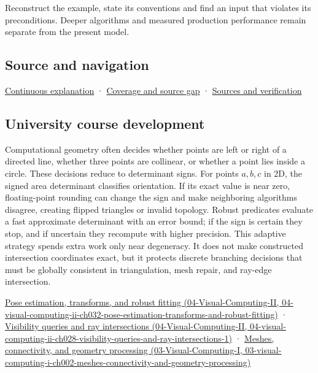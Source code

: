 Reconstruct the example, state its conventions and find an input that violates its preconditions. Deeper algorithms and measured production performance remain separate from the present model.

\subsection{Source and navigation}\label{appendix-da478be01d02-source-and-navigation}

\hyperref[01-foundations-i-ch018-keep-the-promises-visible-while-moving-between-representations]{Continuous explanation} · \hyperref[appendix-fd090d982a15-phase-7---parts-601-700]{Coverage and source gap} · \hyperref[appendix-a103e7846d21-phase-7---source-analysis-and-verification]{Sources and verification}

\subsection{University course development}\label{appendix-da478be01d02-university-course-development}

Computational geometry often decides whether points are left or right of a directed line, whether three points are collinear, or whether a point lies inside a circle. These decisions reduce to determinant signs. For points \(a,b,c\) in 2D, the signed area determinant classifies orientation. If its exact value is near zero, floating-point rounding can change the sign and make neighboring algorithms disagree, creating flipped triangles or invalid topology. Robust predicates evaluate a fast approximate determinant with an error bound; if the sign is certain they stop, and if uncertain they recompute with higher precision. This adaptive strategy spends extra work only near degeneracy. It does not make constructed intersection coordinates exact, but it protects discrete branching decisions that must be globally consistent in triangulation, mesh repair, and ray-edge intersection.

\href{../04-Visual-Computing-II/main.pdf\#nameddest=04-visual-computing-ii-ch032-pose-estimation-transforms-and-robust-fitting}{Pose estimation, transforms, and robust fitting (04-Visual-Computing-II, 04-visual-computing-ii-ch032-pose-estimation-transforms-and-robust-fitting)} · \href{../04-Visual-Computing-II/main.pdf\#nameddest=04-visual-computing-ii-ch028-visibility-queries-and-ray-intersections-1}{Visibility queries and ray intersections (04-Visual-Computing-II, 04-visual-computing-ii-ch028-visibility-queries-and-ray-intersections-1)} · \href{../03-Visual-Computing-I/main.pdf\#nameddest=03-visual-computing-i-ch002-meshes-connectivity-and-geometry-processing}{Meshes, connectivity, and geometry processing (03-Visual-Computing-I, 03-visual-computing-i-ch002-meshes-connectivity-and-geometry-processing)}
